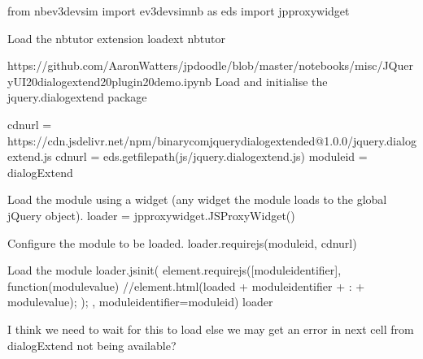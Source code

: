 \documentclass[letterpaper,10pt,english]{sphinxmanual}
\begin{document}
{
\begin{sphinxVerbatim}[commandchars=\\\{\}]
\llap{\color{nbsphinxin}[ ]:\,\hspace{\fboxrule}\hspace{\fboxsep}}from nbev3devsim import ev3devsim\PYGZus{}nb as eds
import jp\PYGZus{}proxy\PYGZus{}widget

\PYGZsh{}Load the nbtutor extension
\PYGZpc{}load\PYGZus{}ext nbtutor

\PYGZsh{}https://github.com/AaronWatters/jp\PYGZus{}doodle/blob/master/notebooks/misc/JQueryUI\PYGZpc{}20dialogextend\PYGZpc{}20plugin\PYGZpc{}20demo.ipynb
\PYGZsh{}Load and initialise the jquery.dialogextend package

cdn\PYGZus{}url = \PYGZdq{}https://cdn.jsdelivr.net/npm/binary\PYGZhy{}com\PYGZhy{}jquery\PYGZhy{}dialogextended@1.0.0/jquery.dialogextend.js\PYGZdq{}
cdn\PYGZus{}url = eds.get\PYGZus{}file\PYGZus{}path(\PYGZsq{}js/jquery.dialogextend.js\PYGZsq{})
module\PYGZus{}id = \PYGZdq{}dialogExtend\PYGZdq{}

\PYGZsh{} Load the module using a widget (any widget \PYGZhy{}\PYGZhy{} the module loads to the global jQuery object).
loader = jp\PYGZus{}proxy\PYGZus{}widget.JSProxyWidget()

\PYGZsh{} Configure the module to be loaded.
loader.require\PYGZus{}js(module\PYGZus{}id, cdn\PYGZus{}url)

\PYGZsh{} Load the module
loader.js\PYGZus{}init(\PYGZdq{}\PYGZdq{}\PYGZdq{}
    element.requirejs([module\PYGZus{}identifier], function(module\PYGZus{}value) \PYGZob{}
        //element.html(\PYGZdq{}loaded \PYGZdq{} + module\PYGZus{}identifier + \PYGZdq{} : \PYGZdq{} + module\PYGZus{}value);
    \PYGZcb{});
\PYGZdq{}\PYGZdq{}\PYGZdq{}, module\PYGZus{}identifier=module\PYGZus{}id)
loader

\PYGZsh{} I think we need to wait for this to load
\PYGZsh{} else we may get an error in next cell from dialogExtend not being available?
\end{sphinxVerbatim}
}
\end{document}
